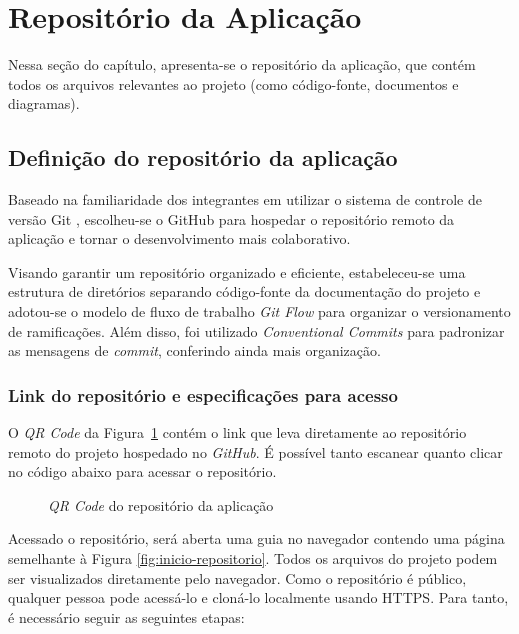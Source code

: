 \section{Repositório da Aplicação}

Nessa seção do capítulo, apresenta-se o repositório da aplicação, que contém todos os arquivos relevantes ao projeto (como código-fonte, documentos e diagramas).

\subsection{Definição do repositório da aplicação}

Baseado na familiaridade dos integrantes em utilizar o sistema de controle de versão Git \cite{git-2025}, escolheu-se o GitHub \cite{github-2025} para hospedar o repositório remoto da aplicação e tornar o desenvolvimento mais colaborativo.

Visando garantir um repositório organizado e eficiente, estabeleceu-se uma estrutura de diretórios separando código-fonte da documentação do projeto e adotou-se o modelo de fluxo de trabalho \textit{Git Flow} \cite{gitflow-2023} para organizar o versionamento de ramificações. Além disso, foi utilizado \textit{Conventional Commits} \cite{convcommits-2025} para padronizar as mensagens de \textit{commit}, conferindo ainda mais organização.

\subsubsection{Link do repositório e especificações para acesso}

O \emph{QR Code} da Figura~\ref{fig:qrcode-repositorio} contém o link que leva diretamente ao repositório remoto do projeto hospedado no \emph{GitHub}. É possível tanto escanear quanto clicar no código abaixo para acessar o repositório.

\begin{figure}[h]
	\centering
		\caption{\emph{QR Code} do repositório da aplicação}
		\label{fig:qrcode-repositorio}
\end{figure}

Acessado o repositório, será aberta uma guia no navegador contendo uma página semelhante à Figura \ref{fig:inicio-repositorio}. Todos os arquivos do projeto podem ser visualizados diretamente pelo navegador. Como o repositório é público, qualquer pessoa pode acessá-lo e cloná-lo localmente usando HTTPS. Para tanto, é necessário seguir as seguintes etapas:
 

